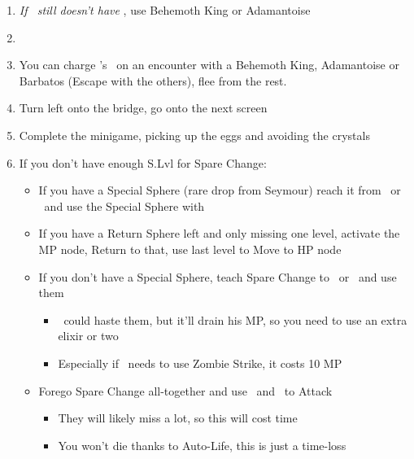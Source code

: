 \begin{enumerate}[resume]
    \item \textit{If \rikku\ still doesn't have \od} \formation{\tidus}{\auron}{\rikku}, use Behemoth King or Adamantoise
    \item \formation{\tidus}{\kimahri}{\auron}
    \item You can charge \rikku's \od\ on an encounter with a Behemoth King, Adamantoise or Barbatos (Escape with the others), flee from the rest.
    \item Turn left onto the bridge, go onto the next screen
    \item Complete the minigame, picking up the eggs and avoiding the crystals
    \item If you don't have enough S.Lvl for Spare Change:
    \begin{itemize}
        \item If you have a Special Sphere (rare drop from Seymour) reach it from \kimahri\ or \rikku\ and use the Special Sphere with \yuna
        \item If you have a Return Sphere left and only missing one level, activate the MP node, Return to that, use last level to Move to HP node
        \item If you don't have a Special Sphere, teach Spare Change to \kimahri\ or \rikku\ and use them
        \begin{itemize}
            \item \tidus\ could haste them, but it'll drain his MP, so you need to use an extra elixir or two
            \item Especially if \tidus\ needs to use Zombie Strike, it costs 10 MP
        \end{itemize}
        \item Forego Spare Change all-together and use \yuna\ and \tidus\ to Attack
        \begin{itemize}
            \item They will likely miss a lot, so this will cost time
            \item You won't die thanks to Auto-Life, this is just a time-loss
        \end{itemize}
    \end{itemize}
\end{enumerate}
